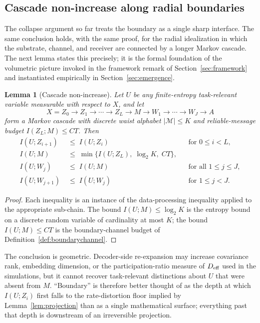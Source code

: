\documentclass[12pt]{article}
\newtheorem{lemma}{Lemma}
\theoremstyle{definition}
\newcommand{\M}{\mathcal{M}}
\newcommand{\I}{I}
\newcommand{\C}{C}
\begin{document}
\subsection{Cascade non-increase along radial boundaries}
\label{sec:cascade}

The collapse argument so far treats the boundary as a single sharp interface. The same conclusion holds, with the same proof, for the radial idealization in which the substrate, channel, and receiver are connected by a longer Markov cascade. The next lemma states this precisely; it is the formal foundation of the volumetric picture invoked in the framework remark of Section~\ref{sec:framework} and instantiated empirically in Section~\ref{sec:emergence}.

\begin{lemma}[Cascade non-increase]
\label{lem:cascade}
Let $U$ be any finite-entropy task-relevant variable measurable with respect to $X$, and let
\[
X = Z_0 \to Z_1 \to \cdots \to Z_L \to M \to W_1 \to \cdots \to W_J \to A
\]
form a Markov cascade with discrete waist alphabet $|\M|\leq K$ and reliable-message budget $\I(Z_L;M)\leq \C T$. Then
\begin{align*}
\I(U;Z_{i+1}) &\;\leq\; \I(U;Z_i) && \text{for } 0\leq i<L, \\
\I(U;M) &\;\leq\; \min\!\big\{\I(U;Z_L),\;\log_2 K,\;\C T\big\}, \\
\I(U;W_j) &\;\leq\; \I(U;M) && \text{for all } 1\leq j\leq J, \\
\I(U;W_{j+1}) &\;\leq\; \I(U;W_j) && \text{for } 1\leq j<J.
\end{align*}
\end{lemma}

\begin{proof}
Each inequality is an instance of the data-processing inequality \citep{coverthomas2006} applied to the appropriate sub-chain. The bound $\I(U;M)\leq\log_2 K$ is the entropy bound on a discrete random variable of cardinality at most $K$; the bound $\I(U;M)\leq\C T$ is the boundary-channel budget of Definition~\ref{def:boundarychannel}.
\end{proof}

The conclusion is geometric. Decoder-side re-expansion may increase covariance rank, embedding dimension, or the participation-ratio measure of $D_{\rm eff}$ used in the simulations, but it cannot recover task-relevant distinctions about $U$ that were absent from $M$. ``Boundary'' is therefore better thought of as the depth at which $\I(U;Z_i)$ first falls to the rate-distortion floor implied by Lemma~\ref{lem:projection} than as a single mathematical surface; everything past that depth is downstream of an irreversible projection.
\end{document}
